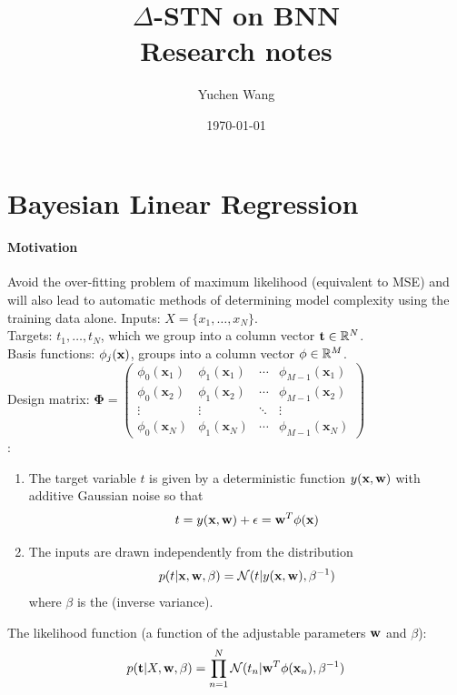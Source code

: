\documentclass[11pt]{article}
\title{$\Delta$-STN on BNN \\ Research notes}
\author{Yuchen Wang}
\date{\today}
\numberwithin{equation}{section}
\begin{document}
    \maketitle
    \tableofcontents
    \newpage

\section{Bayesian Linear Regression}
\paragraph{Motivation}
Avoid the over-fitting problem of maximum likelihood (equivalent to MSE) and will also lead to automatic methods of determining model complexity using the training data alone.
\notation
Inputs: $X = \{x_1, \hdots, x_N\}$.\\
Targets: $t_1, \hdots, t_N$, which we group into a column vector $\textbf{t} \in \mathbb{R}^N$.\\
Basis functions: $\phi_j(\textbf{x})$, groups into a column vector $\phi \in \mathbb{R}^M$.\\
Design matrix:
$\mathbf{\Phi}=\left(\begin{array}{cccc}\phi_{0}\left(\mathbf{x}_{1}\right) & \phi_{1}\left(\mathbf{x}_{1}\right) & \cdots & \phi_{M-1}\left(\mathbf{x}_{1}\right) \\ \phi_{0}\left(\mathbf{x}_{2}\right) & \phi_{1}\left(\mathbf{x}_{2}\right) & \cdots & \phi_{M-1}\left(\mathbf{x}_{2}\right) \\ \vdots & \vdots & \ddots & \vdots \\ \phi_{0}\left(\mathbf{x}_{N}\right) & \phi_{1}\left(\mathbf{x}_{N}\right) & \cdots & \phi_{M-1}\left(\mathbf{x}_{N}\right)\end{array}\right)$\\
: 
\begin{enumerate}
	\item The target variable $t$ is given by a deterministic function $y(\textbf{x}, \textbf{w})$ with additive Gaussian noise so that
	\begin{equation}
	t = y(\textbf{x}, \textbf{w}) + \epsilon = \textbf{w}^T\phi(\textbf{x})
	\end{equation}
	\item The inputs are drawn independently from the distribution
	\begin{equation} \label{lf}
	p(t | \textbf{x}, \textbf{w}, \beta) = \mathcal{N}(t|y(\textbf{x}, \textbf{w}), \beta^{-1})
	\end{equation}
	where $\beta$ is the  (inverse variance).
\end{enumerate}
The likelihood function (a function of the adjustable parameters $\textbf{w}$ and $\beta$):
\begin{equation}
p(\textbf{t} | X, \textbf{w}, \beta) = \prod_{n=1}^N \mathcal{N}(t_n|\textbf{w}^T\phi(\textbf{x}_n), \beta^{-1})
\end{equation}
\end{document}
